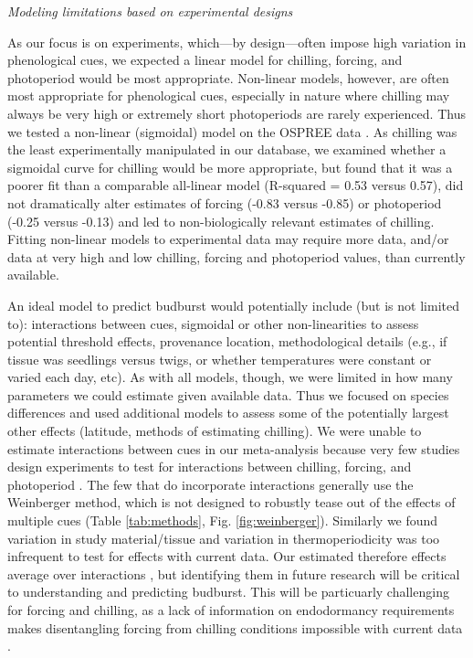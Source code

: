 \documentclass{article}
\begin{document}
\noindent \emph{Modeling limitations based on experimental designs}
\par As our focus is on experiments, which---by design---often impose high variation in phenological cues, we expected a linear model for chilling, forcing, and photoperiod would be most appropriate. Non-linear models, however, are often most appropriate for phenological cues, especially in nature where chilling may always be very high or extremely short photoperiods are rarely experienced. Thus we tested a non-linear (sigmoidal) model on the OSPREE data \citep{pmp}. As chilling was the least experimentally manipulated in our database, we examined whether a sigmoidal curve for chilling would be more appropriate, but found that it was a poorer fit than a comparable all-linear model (R-squared = 0.53 versus 0.57), did not dramatically alter estimates of forcing (-0.83 versus -0.85) or photoperiod (-0.25 versus -0.13) and led to non-biologically relevant estimates of chilling. Fitting non-linear models to experimental data may require more data, and/or data at very high and low chilling, forcing and photoperiod values, than currently available.
\par An ideal model to predict budburst would potentially include (but is not limited to): interactions between cues, sigmoidal or other non-linearities to assess potential threshold effects, provenance location, methodological details (e.g., if tissue was seedlings versus twigs, or whether temperatures were constant or varied each day, etc). As with all models, though, we were limited in how many parameters we could estimate given available data. Thus we focused on species differences and used additional models to assess some of the potentially largest other effects (latitude, methods of estimating chilling). We were unable to estimate interactions between cues in our meta-analysis because very few studies design experiments to test for interactions between chilling, forcing, and photoperiod %
. 
The few that do incorporate interactions generally use the Weinberger method, which is not designed to robustly tease out of the effects of multiple cues (Table \ref{tab:methods}, Fig. \ref{fig:weinberger}).  Similarly we found variation in study material/tissue and variation in thermoperiodicity was too infrequent to test for effects with current data. Our estimated therefore effects average over interactions \citep{gelman2006}, but identifying them in future research will be critical to understanding and predicting budburst. This will be particuarly challenging for forcing and chilling, as a lack of information on endodormancy requirements makes  disentangling forcing from chilling conditions impossible with current data \citep{chuine2016}.
\end{document}
